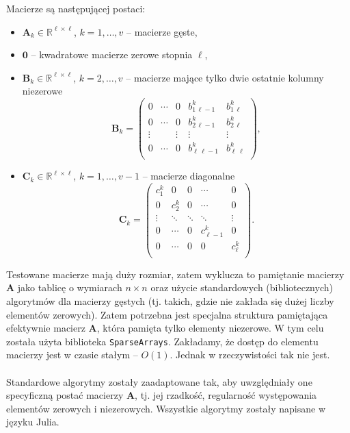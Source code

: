 \documentclass{article}
\begin{document}
    Macierze są następującej postaci:
	\begin{itemize}
		\item $\mathbf{A}_k \in \mathbb{R}^{\ell\times \ell}$,   $k = 1, \ldots,v$ -- macierze gęste,
        \item $\mathbf{0}$ -- kwadratowe macierze zerowe stopnia $\ell$,
		\item $\mathbf{B}_k \in \mathbb{R}^{\ell\times \ell}$,   $k = 2, \ldots,v$ -- macierze mające tylko dwie ostatnie kolumny niezerowe
		$$
		\mathbf{B}_k =
		\left(\begin{array}{ccccc}
		0 & \cdots & 0 & b_{1\,\ell-1}^k & b_{1\,\ell}^k \\
		0 & \cdots & 0 & b_{2\,\ell-1}^k & b_{2\,\ell}^k \\
		\vdots & & \vdots & \vdots & \vdots \\
		0 & \cdots & 0 & b_{\ell\,\ell-1}^k & b_{\ell\,\ell}^k \\
		\end{array}\right),
		$$
		\item $\mathbf{C}_k \in \mathbb{R}^{\ell\times \ell}$,   $k = 1, \ldots,v\!-\!1$ -- macierze diagonalne
		$$
		\mathbf{C}_k =
		\left(\begin{array}{ccccc}
		c_{1}^k & 0 & 0 & \cdots & 0  \\
		0 &  c_{2}^k &  0 & \cdots & 0  \\
		\vdots &  \ddots &  \ddots & \ddots & \vdots  \\
		0 & \cdots & 0 &  c_{\ell-1}^k & 0 \\
		0 & \cdots & 0 &  0 & c_{\ell}^k \\
		\end{array}\right).
		$$
	\end{itemize}

	Testowane macierze mają duży rozmiar, zatem wyklucza to pamiętanie macierzy $\mathbf{A}$ jako tablicę o wymiarach $n \times n$ oraz użycie standardowych (bibliotecznych) algorytmów dla macierzy gęstych (tj. takich, gdzie
	nie zakłada się dużej liczby elementów zerowych). Zatem potrzebna jest specjalna struktura pamiętająca efektywnie macierz $\mathbf{A}$, która pamięta tylko elementy niezerowe. W tym celu została użyta biblioteka \texttt{SparseArrays}. Zakładamy, że dostęp do elementu macierzy jest w czasie stałym -- $O(1)$. Jednak w rzeczywistości tak nie jest. \\ \\
	
	Standardowe algorytmy  zostały zaadaptowane tak, aby uwzględniały one specyficzną postać macierzy $\mathbf{A}$, tj. jej rzadkość, regularność występowania elementów zerowych i niezerowych. Wszystkie algorytmy zostały napisane w języku Julia. \\ \\
\end{document}

